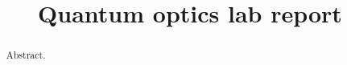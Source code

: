 \documentclass[11pt]{article}
\title{Quantum optics lab report}
\begin{document}
\maketitle

\begin{abstract}
Abstract.
\end{abstract}




\printbibliography
\end{document}
